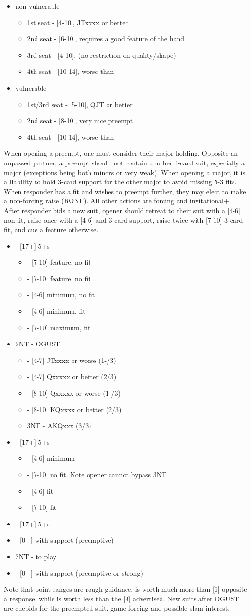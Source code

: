 \documentclass[12pt]{report}
\newcommand{\n}{\\}
\newcommand{\ul}[1]{\begin{itemize}#1\end{itemize}}
\newcommand{\li}{\item[~]}
\begin{document}
    \ul {
        \li non-vulnerable
        \ul {
            \li 1st seat - [4-10], JTxxxx or better
            \li 2nd seat - [6-10], requires a good feature of the hand
            \li 3rd seat - [4-10], (no restriction on quality/shape)
            \li 4th seat - [10-14], worse than \di1-\di2
        }
        \li vulnerable
        \ul {
            \li 1st/3rd seat - [5-10], QJT or better
            \li 2nd seat - [8-10], very nice preempt
            \li 4th seat - [10-14], worse than \di1-\di2
        }
    }

    When opening a preempt, one must consider their major holding.  Opposite an unpassed partner, a preempt should not contain another 4-card suit, especially a major (exceptions being both minors or very weak).  When opening a major, it is a liability to hold 3-card support for the other major to avoid missing 5-3 fits.  When responder has a fit and wishes to preempt further, they may elect to make a non-forcing raise (RONF).  All other actions are forcing and invitational+.\n
    
    After responder bids a new suit, opener should retreat to their suit with a [4-6] non-fit, raise once with a [4-6] and 3-card support, raise twice with [7-10] 3-card fit, and cue a feature otherwise.

    \ul {
        \li {} - [17+] 5+\sp{}s
        \ul {
            \li \cl3 - [7-10] feature, no fit
            \li \di3 - [7-10] feature, no fit
            \li \he3 - [4-6] minimum, no fit
            \li \sp3 - [4-6] minimum, fit
            \li \sp4 - [7-10] maximum, fit
        }
        \li 2NT - OGUST
        \ul {
            \li \cl3 - [4-7] JTxxxx or worse (1-/3)
            \li \di3 - [4-7] Qxxxxx or better (2/3)
            \li \sp3 - [8-10] Qxxxxx or worse (1-/3)
            \li \sp3 - [8-10] KQxxxx or better (2/3)
            \li 3NT - AKQxxx (3/3)
        }
        \li \cl3 - [17+] 5+\cl{}s
        \ul {
            \li \he3 - [4-6] minimum
            \li \sp3 - [7-10] no fit.  Note opener cannot bypass 3NT
            \li \cl4 - [4-6] fit
            \li \cl5 - [7-10] fit
        }
        \li \di3 - [17+] 5+\di{}s
        \li \he3 - [0+] with support (preemptive)
        \li 3NT - to play
        \li \he4 - [0+] with support (preemptive or strong)
    }

    Note that point ranges are rough guidance.  is worth much more than [6] opposite a  response, while  is worth less than the [9] advertised.  New suits after OGUST are cuebids for the preempted suit, game-forcing and possible slam interest.
\end{document}
